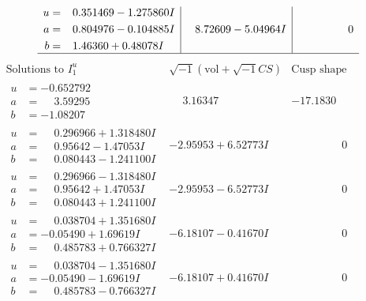 \documentclass[1p]{elsarticle_modified}
\theoremstyle{definition}
\newcommand{\I}{\sqrt{-1}}
\begin{document}
$$\begin{array}{c|c|c}
\begin{aligned}
u &= \phantom{-}0.351469 - 1.275860 I \\
a &= \phantom{-}0.804976 - 0.104885 I \\
b &= \phantom{-}1.46360 + 0.48078 I\end{aligned}
 & \phantom{-}8.72609 - 5.04964 I & \phantom{-0.000000 } 0\\
 \hline 
 \end{array}$$\newpage$$\begin{array}{c|c|c}  
\text{Solutions to }I^u_{1}& \I (\text{vol} + \sqrt{-1}CS) & \text{Cusp shape}\\
 \hline 
\begin{aligned}
u &= -0.652792\phantom{ +0.000000I} \\
a &= \phantom{-}3.59295\phantom{ +0.000000I} \\
b &= -1.08207\phantom{ +0.000000I}\end{aligned}
 & \phantom{-}3.16347\phantom{ +0.000000I} & -17.1830\phantom{ +0.000000I} \\ \hline\begin{aligned}
u &= \phantom{-}0.296966 + 1.318480 I \\
a &= \phantom{-}0.95642 - 1.47053 I \\
b &= \phantom{-}0.080443 - 1.241100 I\end{aligned}
 & -2.95953 + 6.52773 I & \phantom{-0.000000 } 0 \\ \hline\begin{aligned}
u &= \phantom{-}0.296966 - 1.318480 I \\
a &= \phantom{-}0.95642 + 1.47053 I \\
b &= \phantom{-}0.080443 + 1.241100 I\end{aligned}
 & -2.95953 - 6.52773 I & \phantom{-0.000000 } 0 \\ \hline\begin{aligned}
u &= \phantom{-}0.038704 + 1.351680 I \\
a &= -0.05490 + 1.69619 I \\
b &= \phantom{-}0.485783 + 0.766327 I\end{aligned}
 & -6.18107 - 0.41670 I & \phantom{-0.000000 } 0 \\ \hline\begin{aligned}
u &= \phantom{-}0.038704 - 1.351680 I \\
a &= -0.05490 - 1.69619 I \\
b &= \phantom{-}0.485783 - 0.766327 I\end{aligned}
 & -6.18107 + 0.41670 I & \phantom{-0.000000 } 0 \\ \hline\begin{aligned}

\end{aligned}
\end{array}$$
\end{document}

